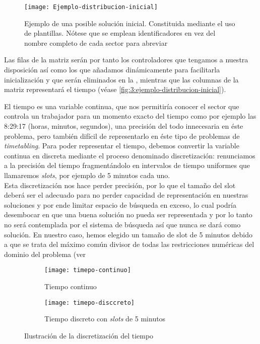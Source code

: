 \begin{figure}
	\centering
	\texttt{[image: Ejemplo-distribucion-inicial]}
	\caption[Ejemplo de una solución inicial]{Ejemplo de una posible solución inicial. Constituida mediante el uso 
		de plantillas. 
		Nótese que se emplean identificadores en vez del nombre completo de cada sector para abreviar}
	\label{fig:3:ejemplo-distribucion-inicial}
\end{figure}

Las filas de la matriz serán por tanto los controladores que tengamos a nuestra disposición así como los que añadamos 
dinámicamente para facilitarla inicialización y que serán eliminados en la \fasedos{}, mientras que las columnas de la 
matriz representará el tiempo (véase \autoref{fig:3:ejemplo-distribucion-inicial}).

El tiempo es una variable continua, que nos permitiría conocer el sector que controla un trabajador para un momento 
exacto del tiempo como por ejemplo las 8:29:17 (horas, minutos, segundos), una precisión del todo innecesaria en éste 
problema, pero también difícil de representarlo en éste tipo de problemas de \textit{timetabling}. Para poder 
representar el tiempo, debemos convertir la variable continua en discreta mediante el proceso denominado 
discretización: renunciamos a la precisión del tiempo fragmentándolo en intervalos de tiempo uniformes que llamaremos 
\textit{slots}, por ejemplo de 5 minutos cada uno.
\\

Esta discretización nos hace perder precisión, por lo que el tamaño del slot deberá ser el adecuado para no perder 
capacidad de representación en nuestras soluciones y por ende limitar espacio de búsqueda en exceso, lo cual podría 
desembocar en que una buena solución no pueda ser representada y por lo tanto no será contemplada por el sistema de 
búsqueda así que nunca se dará como solución.
En nuestro caso, hemos elegido un tamaño de slot de 5 minutos debido a que se trata del máximo común divisor de todas 
las restricciones numéricas del dominio del problema (ver %

\begin{figure}[htbp]
	\begin{subfigure}{\linewidth}
		\centering
		\texttt{[image: timepo-continuo]}
		\caption{Tiempo continuo}
		\label{fig:timepo-continuo}
	\end{subfigure}

	\begin{subfigure}{\linewidth}
		\centering
		\texttt{[image: timepo-disccreto]}
		\caption{Tiempo discreto con \textit{slots} de 5 minutos}
		\label{fig:timepo-disccreto}
	\end{subfigure}

	\caption{Ilustración de la discretización del tiempo}
\end{figure}

